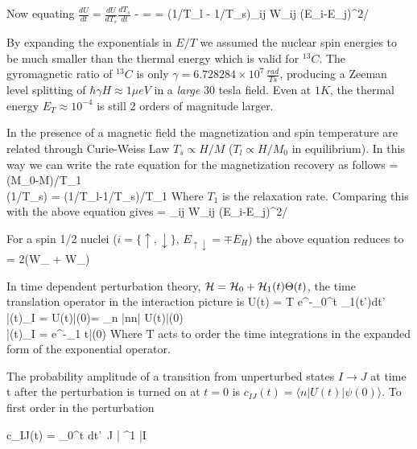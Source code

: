 \documentclass{article}
\begin{document}
Now equating $\frac{dU}{dt} = \frac{dU}{dT_s} \frac{dT_s}{dt}$
\bea
- = = \big(1/T_l - 1/T_s\big)\sum\limits_{ij} W_{ij} (E_i-E_j)^2/ 
\eea

By expanding the exponentials in $E/T$ we assumed the nuclear spin energies to be much smaller than the thermal energy which is valid for ${}^{13}C$. The gyromagnetic ratio of ${}^{13}C$ is only $\gamma = 6.728284 \times 10^7 \,\frac{rad}{T s}$, producing a Zeeman level splitting of $\hbar\gamma H \approx 1\mu eV$ in a \emph{large} $30$ tesla field. Even at $1K$, the thermal energy $E_T\approx 10^{-4}$ is still 2 orders of magnitude larger.

In the presence of a magnetic field the magnetization and spin temperature are related through Curie-Weiss Law $T_s \propto H/M$ ($T_l \propto H/M_0$ in equilibrium). In this way we can write the rate equation for the magnetization recovery as follows 
\bea
{} = (M_0-M)/T_1 \\
(1/T_s) = (1/T_l-1/T_s)/T_1
\eea
Where $T_1$ is the relaxation rate. Comparing this with the above equation gives
\be
{} = \sum\limits_{ij} W_{ij} (E_i-E_j)^2/
\ee

For a spin 1/2 nuclei ($i = \{\uparrow,\downarrow\}$, $E_{\uparrow\downarrow} = \mp E_H$) the above equation reduces to
\be
{} = 2(W_{\uparrow\downarrow} + W_{\downarrow\uparrow})
\ee

In time dependent perturbation theory, ${\cal H} = {\cal H}_0 + {\cal H}_1(t)\Theta(t)$, the time translation operator in the interaction picture is
\bea
U(t) = T e^{-\int\limits_{0}^t \cH_1(t')dt'} \\
|\psi(t)\rangle {}_I = U(t)|\psi(0)\rangle = \sum\limits_n |n\rangle\langle n| U(t)|\psi(0)\rangle \\
|\psi(t)\rangle {}_I  = e^{-\cH_1 t}|\psi(0)\rangle {}
\eea
Where T acts to order the time integrations in the expanded form of the exponential operator.

The probability amplitude of a transition from unperturbed states $I\rightarrow J$ at time t after the perturbation is turned on at $t=0$ is $c_{IJ}(t) = \langle n| U(t)|\psi(0)\rangle$. To first order in the perturbation

\bea
c_{IJ}(t) = \int\limits_0^t dt'\, \langle J |  \cH^1 |I \rangle \\
\eea
\end{document}
